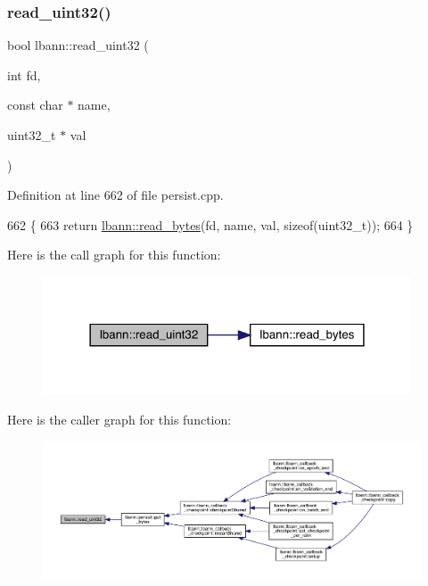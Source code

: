 \subsubsection{\texorpdfstring{read\+\_\+uint32()}{read\_uint32()}}
{\footnotesize\ttfamily bool lbann\+::read\+\_\+uint32 (\begin{DoxyParamCaption}\item[{int}]{fd,  }\item[{const char $\ast$}]{name,  }\item[{uint32\+\_\+t $\ast$}]{val }\end{DoxyParamCaption})}



Definition at line 662 of file persist.\+cpp.


\begin{DoxyCode}
662                                                                \{
663   \textcolor{keywordflow}{return} \hyperlink{namespacelbann_a85385e2a9e058b6720300b4cbdd2b1d0}{lbann::read\_bytes}(fd, name, val, \textcolor{keyword}{sizeof}(uint32\_t));
664 \}
\end{DoxyCode}
Here is the call graph for this function\+:\nopagebreak
\begin{figure}[H]
\begin{center}
\leavevmode
\includegraphics[width=310pt]{namespacelbann_aedcde4d93c4feb5090c927de1c45b90d_cgraph}
\end{center}
\end{figure}
Here is the caller graph for this function\+:\nopagebreak
\begin{figure}[H]
\begin{center}
\leavevmode
\includegraphics[width=350pt]{namespacelbann_aedcde4d93c4feb5090c927de1c45b90d_icgraph}
\end{center}
\end{figure}
\mbox{\label{namespacelbann_a7ca20ac4f0ec9feaa2f6d5b6ef3c8865}} 
